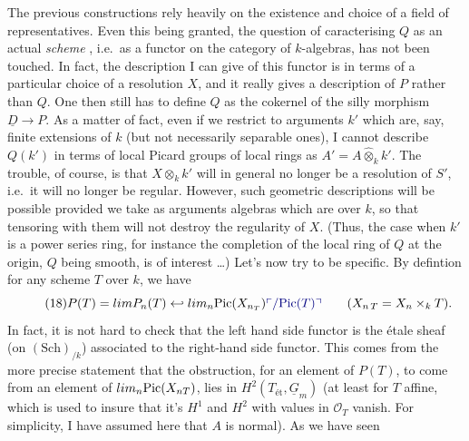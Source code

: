 \documentclass[11pt,a4paper]{article}
\begin{document}
The previous constructions rely heavily on the existence and choice of a field
of representatives. Even this being granted, the question of caracterising $Q$
as an actual \emph{scheme} , i.e.\ as a functor on the category
of $k$-algebras, has not been touched. In fact, the description I can give of
this functor is  in terms of a particular choice of
a resolution $X$, and it really gives  a description of $P$
rather than $Q$. One then still has to define $Q$ as the cokernel of the silly
morphism $\underline{D} \to P$. As a matter of fact, even if we restrict to
arguments $k'$ which are, say, finite extensions of $k$ (but not necessarily
separable ones), I cannot describe $Q(k')$ in terms of local Picard groups of
local rings as $A' = A \hat{\otimes}_k k'$. The trouble, of course, is that
$X \otimes_k k'$ will in general no longer be a resolution of $S'$, i.e.\ it
will no longer be regular. However, such geometric descriptions will be
possible provided we take as arguments algebras which are
  over $k$, so
that tensoring with them will not destroy the regularity of $X$. (Thus, the
case when $k'$ is a power series ring, for instance the completion of the
local ring of $Q$ at the origin, $Q$ being smooth, is of interest …) Let's
now try to be specific. By defintion  for any
 scheme $T$ over $k$, we have
\begin{equation*}
\tag{18} P(T) = \varprojlim P_n(T) \hookleftarrow \varprojlim_n \mathrm{Pic}(X_{n_T}) \text{\add{$/\mathrm{Pic}(T)$}}
\qquad (X_{n\,T} = X_n \times_k T) .
\end{equation*}
In fact, it is not hard to check that the left hand side functor is the étale
sheaf (on $(\mathrm{Sch})_{/k}$) associated to the right-hand side functor.
This comes from the more precise statement that the obstruction, for an
element of $P(T)$, to come from an element of
$\varprojlim_n \mathrm{Pic}(X_{nT})$, lies in
$H^2(T_{\text{ét}}, \underline{G}_m)$ (at least for $T$ affine, which is used
to insure that it's $H^1$ and $H^2$ with values in $\mathcal{O}_T$ vanish.
For simplicity, I have assumed here that $A$ is normal). As we have
seen
\end{document}
